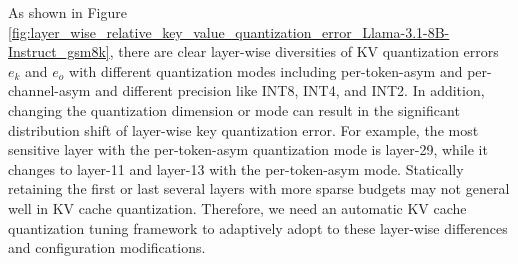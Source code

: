 %
%
\begin{table}[H]
\centering
{}
\caption{Key and value cache quantization relative error analysis of different precision and quantization methods. We collect BF16 KV cache of 20 prompts from the GSM8K zero-shot dataset with Llama-3.1-8B-Instruct and then perform offline quantization to compute the mean error between BF16 and dequantized KV cache.} 
\label{tab:kvcache_quantization_error_per_channel_per_token_asym}
\end{table}

As shown in Figure \ref{fig:layer_wise_relative_key_value_quantization_error_Llama-3.1-8B-Instruct_gsm8k}, there are clear layer-wise diversities of KV quantization errors $e_k$ and $e_o$ with different quantization modes including per-token-asym and per-channel-asym and different precision like INT8, INT4, and INT2. In addition, changing the quantization dimension or mode can result in the significant distribution shift of layer-wise key quantization error. For example, the most sensitive layer with the per-token-asym quantization mode is layer-29, while it changes to layer-11 and layer-13 with the per-token-asym mode. Statically retaining the first or last several layers with more sparse budgets \cite{tang2024quest} may not general well in KV cache quantization. Therefore, we need an automatic KV cache quantization tuning framework to adaptively adopt to these layer-wise differences and configuration modifications.

